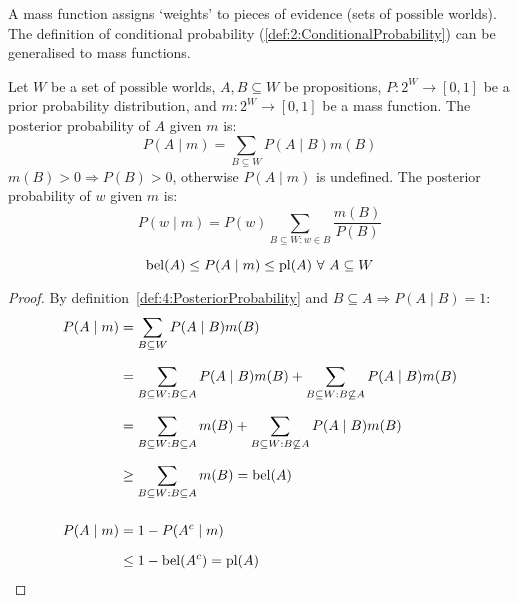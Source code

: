 A mass function assigns `weights' to pieces of evidence (sets of possible worlds).
The definition of conditional probability (\ref{def:2:ConditionalProbability})
can be generalised to mass functions.

\begin{dfn}
  \label{def:4:PosteriorProbability}
  Let $W$ be a set of possible worlds, $A, B \subseteq W$ be propositions,
  $P : 2^W \to [0, 1]$ be a prior probability distribution, and
  $m : 2^W \to [0, 1]$ be a mass function.
  The posterior probability of $A$ given $m$ is:
  \begin{equation}
    P(A \mid m) = \sum_{B \subseteq W} P(A \mid B) m(B)
  \end{equation}
  $m(B) > 0 \Rightarrow P(B) > 0$, otherwise $P(A \mid m)$ is undefined.
  The posterior probability of $w$ given $m$ is:
  \begin{equation}
    P(w \mid m) = P(w) \sum_{B \subseteq W : w \in B} \frac{m(B)}{P(B)}
  \end{equation}
\end{dfn}

\begin{thm}
  \begin{equation}
    \bel(A) \leq P(A \mid m) \leq \pl(A) \ \forall\ A \subseteq W
  \end{equation}
  \begin{proof}
    By definition~\ref{def:4:PosteriorProbability} and
    $B \subseteq A \Rightarrow P(A \mid B) = 1$:
    \begin{align*}
      P(A \mid m)
       & = \sum_{B \subseteq W} P(A \mid B) m(B)                  \\[1.5ex]
       & = \sum_{B \subseteq W : B \subseteq A} P(A \mid B) m(B)
      + \sum_{B \subseteq W : B \not\subseteq A} P(A \mid B) m(B) \\[1.5ex]
       & = \sum_{B \subseteq W : B \subseteq A} m(B)
      + \sum_{B \subseteq W : B \not\subseteq A} P(A \mid B) m(B) \\[1.5ex]
       & \geq \sum_{B \subseteq W : B \subseteq A} m(B) = \operatorname*{bel}(A) \\[3ex]
      P(A \mid m)
       & = 1 - P(A^c \mid m)                                      \\[1.5ex]
       & \leq 1 - \operatorname*{bel}(A^c) = \operatorname*{pl}(A)
    \end{align*}
  \end{proof}
\end{thm}

